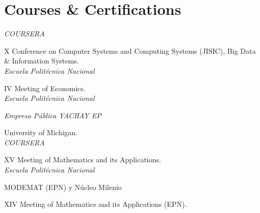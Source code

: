 \documentclass[letterpaper]{twentysecondcv} %
\begin{document}

\section{Courses \& Certifications}

\begin{twentyshort} %
    

    
	{\emph{COURSERA}}
	
	{X Conference on Computer Systems and Computing Systems (JISIC), Big Data \& Information Systems. \\ 
	\emph{Escuela Politécnica Nacional}
	}
	
	{IV Meeting of Economics. \\ 
	\emph{Escuela Politécnica Nacional}
	}
	
	{
	\emph{Empresa Pública YACHAY EP}
	}
	
	{University of Michigan. \\ 
	\emph{COURSERA}
	}
	
	{XV Meeting of Mathematics and its Applications. \\ 
	\emph{Escuela Politécnica Nacional}
	}
	
	
	{MODEMAT (EPN) y Núcleo Milenio 
	}
	
	{XIV Meeting of Mathematics and its Applications (EPN). 
	}

	

	
\end{twentyshort}
\end{document}
